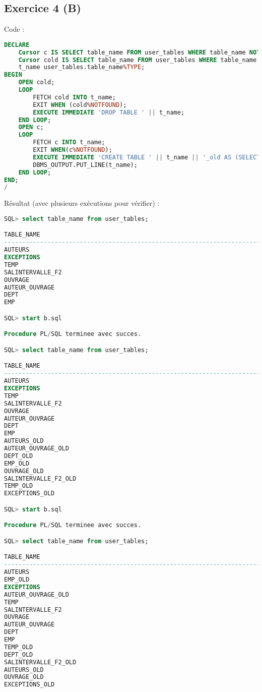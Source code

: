 \documentclass{article}
\begin{document}
\subsection{Exercice 4 (B)}
Code :
\begin{lstlisting}[language=SQL,
    deletekeywords={char},
    morekeywords={DECLARE, LOOP, TYPE, FOR, IF, IS, OPEN, FETCH, DBMS_OUTPUT, PUT_LINE}]
DECLARE
	Cursor c IS SELECT table_name FROM user_tables WHERE table_name NOT LIKE '%_OLD';
	Cursor cold IS SELECT table_name FROM user_tables WHERE table_name LIKE '%_OLD';
	t_name user_tables.table_name%TYPE;
BEGIN
	OPEN cold;
	LOOP
		FETCH cold INTO t_name;
		EXIT WHEN (cold%NOTFOUND);
		EXECUTE IMMEDIATE 'DROP TABLE ' || t_name;
	END LOOP;
	OPEN c;
	LOOP
		FETCH c INTO t_name;
		EXIT WHEN(c%NOTFOUND); 
		EXECUTE IMMEDIATE 'CREATE TABLE ' || t_name || '_old AS (SELECT * FROM ' || t_name || ')';
		DBMS_OUTPUT.PUT_LINE(t_name);
	END LOOP;
END;
/
\end{lstlisting}

Résultat (avec plusieurs exécutions pour vérifier) :
\begin{lstlisting}[language=SQL,
    morekeywords={DECLARE, LOOP, TYPE, FOR, IF, IS, OPEN, FETCH, DBMS_OUTPUT, PUT_LINE}]
SQL> select table_name from user_tables;

TABLE_NAME
--------------------------------------------------------------------------------
AUTEURS
EXCEPTIONS
TEMP
SALINTERVALLE_F2
OUVRAGE
AUTEUR_OUVRAGE
DEPT
EMP

SQL> start b.sql

Procedure PL/SQL terminee avec succes.

SQL> select table_name from user_tables;

TABLE_NAME
--------------------------------------------------------------------------------
AUTEURS
EXCEPTIONS
TEMP
SALINTERVALLE_F2
OUVRAGE
AUTEUR_OUVRAGE
DEPT
EMP
AUTEURS_OLD
AUTEUR_OUVRAGE_OLD
DEPT_OLD
EMP_OLD
OUVRAGE_OLD
SALINTERVALLE_F2_OLD
TEMP_OLD
EXCEPTIONS_OLD

SQL> start b.sql

Procedure PL/SQL terminee avec succes.

SQL> select table_name from user_tables;

TABLE_NAME
--------------------------------------------------------------------------------
AUTEURS
EMP_OLD
EXCEPTIONS
AUTEUR_OUVRAGE_OLD
TEMP
SALINTERVALLE_F2
OUVRAGE
AUTEUR_OUVRAGE
DEPT
EMP
TEMP_OLD
DEPT_OLD
SALINTERVALLE_F2_OLD
AUTEURS_OLD
OUVRAGE_OLD
EXCEPTIONS_OLD
\end{lstlisting}
\end{document}
